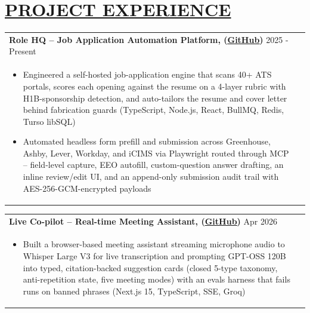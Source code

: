 \documentclass[a4paper,10pt]{extarticle}
\begin{document}
\vspace{4pt}

\section{\href{https://swapnilmane22.github.io/portfolio/}{PROJECT EXPERIENCE}}

\vspace{2pt}

\begin{tabularx}{\linewidth}{ @{}l r@{} }
\color[HTML]{000000} \textbf{{{Role HQ -- Job Application Automation Platform, (}\uline{\href{https://github.com/SwapnilMane22/ATS}{GitHub}})}} \hfill \color[HTML]{000000}2025 - Present \\[2pt]
\begin{minipage}[t]{\linewidth}
    \begin{itemize}[nosep, leftmargin=2em, itemsep=1pt]
        \item Engineered a self-hosted job-application engine that scans 40+ ATS portals, scores each opening against the resume on a 4-layer rubric with H1B-sponsorship detection, and auto-tailors the resume and cover letter behind fabrication guards (TypeScript, Node.js, React, BullMQ, Redis, Turso libSQL)
        \item Automated headless form prefill and submission across Greenhouse, Ashby, Lever, Workday, and iCIMS via Playwright routed through MCP -- field-level capture, EEO autofill, custom-question answer drafting, an inline review/edit UI, and an append-only submission audit trail with AES-256-GCM-encrypted payloads
    \end{itemize}
    \end{minipage}
\end{tabularx}

\vspace{-2pt}

\begin{tabularx}{\linewidth}{ @{}l r@{} }
\color[HTML]{000000} \textbf{{{Live Co-pilot -- Real-time Meeting Assistant, (}\uline{\href{https://github.com/SwapnilMane22/live-copilot}{GitHub}})}} \hfill \color[HTML]{000000}Apr 2026 \\[2pt]
\begin{minipage}[t]{\linewidth}
    \begin{itemize}[nosep, leftmargin=2em, itemsep=1pt]
        \item Built a browser-based meeting assistant streaming microphone audio to Whisper Large V3 for live transcription and prompting GPT-OSS 120B into typed, citation-backed suggestion cards (closed 5-type taxonomy, anti-repetition state, five meeting modes) with an evals harness that fails runs on banned phrases (Next.js 15, TypeScript, SSE, Groq)
    \end{itemize}
    \end{minipage}
\end{tabularx}
\end{document}
